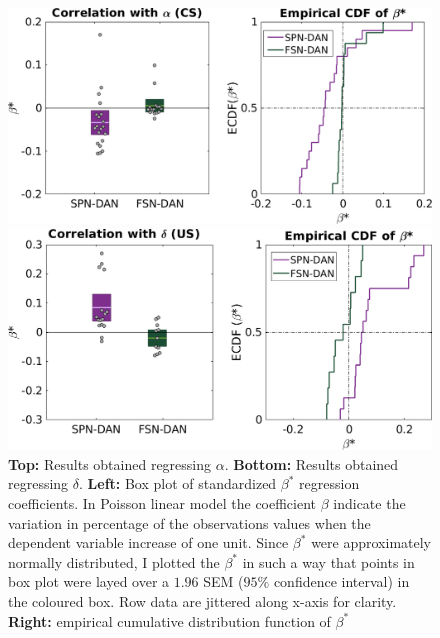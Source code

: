 \begin{figure}[H]
    \centering
    \includegraphics[scale=0.42]{figures/alphaRegrNew3.png}
    
    \vspace{1cm}
    \includegraphics[scale=0.42]{figures/deltaRegr3.png}
    \caption{\textbf{Top:} Results obtained regressing $\alpha$. \textbf{Bottom:} Results obtained regressing $\delta$. \textbf{Left:} Box plot of standardized $\beta^*$ regression coefficients. In Poisson linear model the coefficient $\beta$ indicate the variation in percentage of the observations values when the dependent variable increase of one unit. Since $\beta^*$ were approximately normally distributed, I plotted the $\beta^*$ in such a way that points in box plot were layed over a $1.96$ SEM ($95\%$ confidence interval) in the coloured box. Row data are jittered along x-axis for clarity. \textbf{Right:} empirical cumulative distribution function of $\beta^*$}
    \label{fig:AlphaDeltaReg}
\end{figure}

